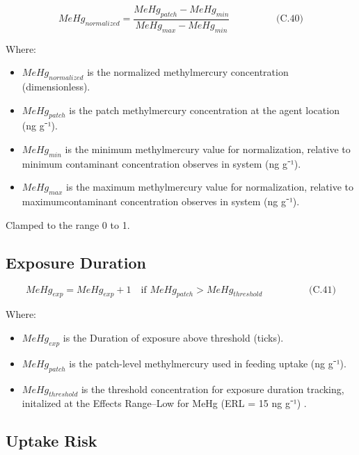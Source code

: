 \documentclass[
]{book}
\providecommand{\tightlist}{%
  \setlength{\itemsep}{0pt}\setlength{\parskip}{0pt}}
\begin{document}
\[
\begin{equation} MeHg_{normalized} = \frac{MeHg_{patch} - MeHg_{min}}{MeHg_{max} - MeHg_{min}}  \hspace{2cm} \text{(C.40)} \end{equation}
\]

Where:

\begin{itemize}
\item
  \(MeHg_{normalized}\) is the normalized methylmercury concentration
  (dimensionless).
\item
  \(MeHg_{patch}\) is the patch methylmercury concentration at the agent
  location (ng g⁻¹).
\item
  \(MeHg_{min}\) is the minimum methylmercury value for normalization,
  relative to minimum contaminant concentration observes in system (ng
  g⁻¹).
\item
  \(MeHg_{max}\) is the maximum methylmercury value for normalization,
  relative to maximumcontaminant concentration observes in system (ng
  g⁻¹).
\end{itemize}

Clamped to the range 0 to 1.

\subsection{Exposure Duration}\label{exposure-duration}

\[
\begin{equation} MeHg_{exp} = MeHg_{exp} + 1 \quad \text{if } MeHg_{patch} > MeHg_{threshold}  \hspace{2cm} \text{(C.41)} \end{equation}
\]

Where:

\begin{itemize}
\tightlist
\item
  \(MeHg_{exp}\) is the Duration of exposure above threshold (ticks).
\item
  \(MeHg_{patch}\) is the patch-level methylmercury used in feeding
  uptake (ng g⁻¹).
\item
  \(MeHg_{threshold}\) is the threshold concentration for exposure
  duration tracking, initalized at the Effects Range--Low for MeHg
  (ERL = 15 ng g⁻¹)
  \citep{noaa_national_oceanic_and_atmospheric_administration_sediment_1990}.
\end{itemize}

\subsection{Uptake Risk}\label{uptake-risk}
\end{document}
